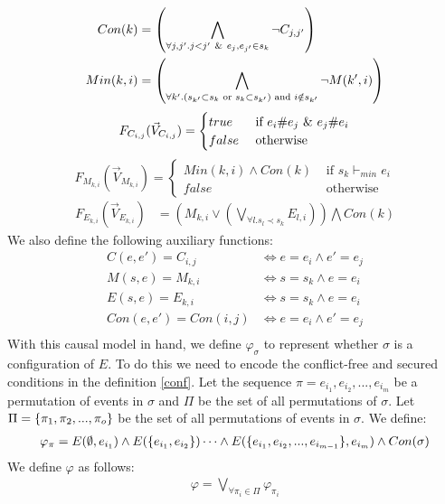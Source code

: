 \begin{align*}
    Con(k) & =   \left(
    \bigwedge_{\forall j,j'. j<j' \ \& \  e_j,e_{j'} \in s_k}
    \neg C_{j,j'}
    \right)             \\
    Min(k,i) & = \left(
        \bigwedge_{\forall k'. (s_{k'} \subset s_k \text{ or } s_k \subset s_{k'}) 
        \text{ and } i \notin s_{k'}}
        \neg M(k',i)
    \right)
\end{align*}
$$
    F_{C_{i,j}}(\vec V_{C_{i,j}}) = \begin{cases}
        true  & \text{ if } e_i \# e_j \ \& \  e_j \# e_i \\
        false & \text{ otherwise }
    \end{cases}
$$
$$
    F_{M_{k,i}}(\vec V_{M_{k,i}}) = \begin{cases}
        Min(k,i) \wedge Con(k) & \text{ if } s_k \vdash_{min} e_i \\
        false  & \text{ otherwise }
    \end{cases}
$$
\begin{align*}
    F_{E_{k,i}}(\vec V_{E_{k,i}}) & =
    \left(
    M_{k,i} \vee
    \left(
    \bigvee_{\forall l. s_l  \prec s_k}E_{l,i}
    \right)
    \right)
    \bigwedge
    Con(k)
\end{align*}
We also define the following auxiliary functions:
\begin{align*}
    C(e,e') = C_{i,j}    & \iff e = e_i \wedge e' = e_j \\
    M(s,e)  = M_{k,i}    & \iff s = s_k \wedge e = e_i  \\
    E(s,e)  = E_{k,i}    & \iff s = s_k \wedge e = e_i  \\
    Con(e,e') = Con(i,j) & \iff e = e_i \wedge e' = e_j \\
\end{align*}
With this causal model in hand, we define $\varphi_{\sigma}$ to represent whether $\sigma$ is a configuration of $E$.
To do this we need to encode the conflict-free and secured conditions in the definition \ref{conf}.
Let the sequence $\pi = e_{i_1},e_{i_2},...,e_{i_m}$ be a
permutation of events in $\sigma$ and $\Pi$ be the set of
all permutations of $\sigma$.
Let $\Pi = \{\pi_1,\pi_2,...,\pi_o\}$ be the set of
all permutations of events in $\sigma$.
We define:
\begin{align*}
    \varphi_{\pi} = E(\emptyset,e_{i_1}) \wedge
    E(\{e_{i_1},e_{i_2}\}) \dots
    \wedge E(\{e_{i_1},e_{i_2},...,e_{i_{m-1}}\},e_{i_m}) \wedge Con(\sigma)
\end{align*}
We define $\varphi$ as follows:
\begin{align*}
    \varphi = \bigvee_{\forall \pi_i \in \Pi}\varphi_{\pi_i}
\end{align*}
\pagebreak
